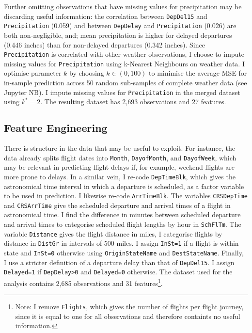 \documentclass[
]{article}
\begin{document}
Further omitting observations that have missing values for precipitation
may be discarding useful information: the correlation between
\texttt{DepDel15} and \texttt{Precipitation} (0.059) and between
\texttt{DepDelay} and \texttt{Precipitation} (0.026) are both
non-negligible, and; mean precipitation is higher for delayed departures
(0.446 inches) than for non-delayed departures (0.342 inches). Since
\texttt{Precipitation} is correlated with other weather observations, I
choose to impute missing values for \texttt{Precipitation} using
k-Nearest Neighbours on weather data. I optimise parameter \(k\) by
choosing \(k \in (0,100)\) to minimise the average MSE for in-sample
prediction across 50 random sub-samples of complete weather data (see
Jupyter NB). I impute missing values for \texttt{Precipitation} in the
merged dataset using \(k^*=2\). The resulting dataset has 2,693
observations and 27 features.

\subsection{Feature Engineering}

There is structure in the data that may be useful to exploit. For
instance, the data already splits flight dates into \texttt{Month},
\texttt{DayofMonth}, and \texttt{DayofWeek}, which may be relevant in
predicting flight delays if, for example, weekend flights are more prone
to delays. In a similar vein, I re-code \texttt{DepTimeBlk}, which gives
the astronomical time interval in which a departure is scheduled, as a
factor variable to be used in prediction. I likewise re-code
\texttt{ArrTimeBlk}. The variables \texttt{CRSDepTime} and
\texttt{CRSArrTime} give the scheduled departure and arrival times of a
flight in astronomical time. I find the difference in minutes between
scheduled departure and arrival times to categorise scheduled flight
lengths by hour in \texttt{SchFlTm}. The variable \texttt{Distance}
gives the flight distance in miles, I categorise flights by distance in
\texttt{DistGr} in intervals of 500 miles. I assign \texttt{InSt=1} if a
flight is within state and \texttt{InSt=0} otherwise using
\texttt{OriginStateName} and \texttt{DestStateName}. Finally, I use a
stricter definition of a departure delay than that of \texttt{DepDel15}.
I assign \texttt{Delayed=1} if \texttt{DepDelay>0} and
\texttt{Delayed=0} otherwise. The dataset used for the analysis contains
2,685 observations and 31
features\footnote{Note: I remove \texttt{Flights}, which gives the number of flights per flight journey, since it is equal to one for all observations and therefore containts no useful information.}.
\end{document}
